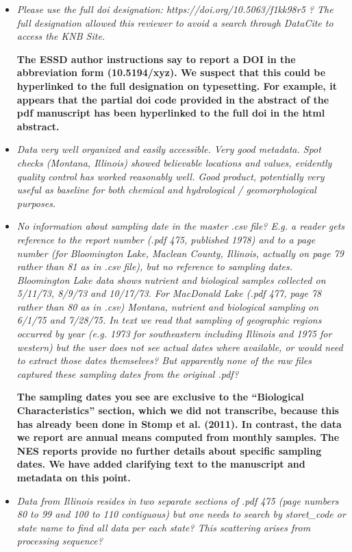 \documentclass{article}
\begin{document}
\begin{itemize}
    
    \item \emph{Please use the full doi designation: https://doi.org/10.5063/f1kk98r5 ? The full designation allowed this reviewer to avoid a search through DataCite to access the KNB Site.}

\textbf{The ESSD author instructions say to report a DOI in the abbreviation form (10.5194/xyz). We suspect that this could be hyperlinked to the full designation on typesetting. For example, it appears that the partial doi code provided in the abstract of the pdf manuscript has been hyperlinked to the full doi in the html abstract.}

\item \emph{Data very well organized and easily accessible. Very good metadata. Spot checks (Montana, Illinois) showed believable locations and values, evidently quality control has worked reasonably well. Good product, potentially very useful as baseline for both chemical and hydrological / geomorphological purposes.}

\item \emph{No information about sampling date in the master .csv file? E.g. a reader gets reference to the report number (.pdf 475, published 1978) and to a page number (for Bloomington Lake, Maclean County, Illinois, actually on page 79 rather than 81 as in .csv file), but no reference to sampling dates. Bloomington Lake data shows nutrient and biological samples collected on 5/11/73, 8/9/73 and 10/17/73. For MacDonald Lake (.pdf 477, page 78 rather than 80 as in .csv) Montana, nutrient and biological sampling on 6/1/75 and 7/28/75. In text we read that sampling of geographic regions occurred by year (e.g. 1973 for southeastern including Illinois and 1975 for western) but the user does not see actual dates where available, or would need to extract those dates themselves? But apparently none of the raw files captured these sampling dates from the original .pdf?}

\textbf{The sampling dates you see are exclusive to the “Biological Characteristics” section, which we did not transcribe, because this has already been done in Stomp et al. (2011). In contrast, the data we report are annual means computed from monthly samples. The NES reports provide no further details about specific sampling dates. We have added clarifying text to the manuscript and metadata on this point.}

\item \emph{Data from Illinois resides in two separate sections of .pdf 475 (page numbers 80 to 99 and 100 to 110 contiguous) but one needs to search by storet\_code or state name to find all data per each state? This scattering arises from processing sequence?}


\end{itemize}
\end{document}
